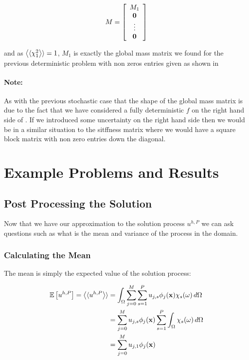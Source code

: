 \begin{equation}
    M = \left[\begin{array}{c}
            M_1 \\ \mathbf{0} \\ \vdots \\ \mathbf{0}
    \end{array}\right]
\end{equation}

and as $\left\langle\langle\chi_1^2\right\rangle\rangle = 1$, $M_1$ is exactly the global mass matrix we found
for the previous deterministic problem with non zeros entries given as shown in


\paragraph{Note:}

As with the previous stochastic case that the shape of the global mass matrix
is due to the fact that we have considered a fully deterministic $f$ on the
right hand side of . If we introduced some uncertainty
on the right hand side then we would be in a similar situation to the sitffness
matrix where we would have a square block matrix with non zero entries down the
diagonal.

\section{Example Problems and Results}

\subsection{Post Processing the Solution}

Now that we have our approximation to the solution process $u^{h,P}$ we can ask
questions such as what is the mean and variance of the process in the domain.

\subsubsection{Calculating the Mean}

The mean is simply the expected value of the solution process:

\begin{align}
  \begin{split}
    \mathbb{E}\left[u^{h,P}\right] = \left\langle\langle u^{h,P}\right\rangle\rangle
      &= \int_\Omega\sum_{j=0}^M\sum_{s=1}^Pu_{j,s}\phi_j(\mathbf{x})\chi_s(\omega)\, d\Omega \\
      &= \sum_{j=0}^Mu_{j,s}\phi_j(\mathbf{x})\sum_{s=1}^P\int_\Omega\chi_s(\omega)\, d\Omega \\
      &= \sum_{j=0}^Mu_{j,1}\phi_j(\mathbf{x})
  \end{split}
\end{align}


